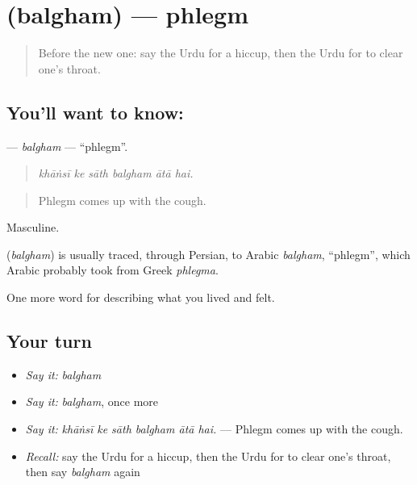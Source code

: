 \section[\texorpdfstring{\ur{بلغم} (balgham)}{بلغم (balgham)}]{ (balgham) — phlegm}

\label{lesson:UR-C469-balgham}



\begin{quote}
Before the new one: say the Urdu for a hiccup, then the Urdu for to clear one's throat.
\end{quote}

\subsection*{You'll want to know: }
\textbf{} — \emph{balgham} — \textquotedblleft{}phlegm\textquotedblright{}.

\begin{quote}
     
\end{quote}

\begin{quote}
\emph{khāṅsī ke sāth balgham ātā hai.}
\end{quote}

\begin{quote}
Phlegm comes up with the cough.
\end{quote}

Masculine.

\begin{cousinweb}
\textbf{} (\emph{balgham}) is usually traced, through Persian, to Arabic \emph{balgham}, \textquotedblleft{}phlegm\textquotedblright{}, which Arabic probably took from Greek \emph{phlegma}.
\end{cousinweb}

\begin{grammarlens}[title={What you've built}]
One more word for describing what you lived and felt.
\end{grammarlens}

\subsection*{Your turn}
\begin{itemize}
\raggedright
  \item \emph{Say it:} \emph{balgham}
  \item \emph{Say it:} \emph{balgham}, once more
  \item \emph{Say it:} \emph{khāṅsī ke sāth balgham ātā hai.} — Phlegm comes up with the cough.
  \item \emph{Recall:} say the Urdu for a hiccup, then the Urdu for to clear one's throat, then say \emph{balgham} again
\end{itemize}

